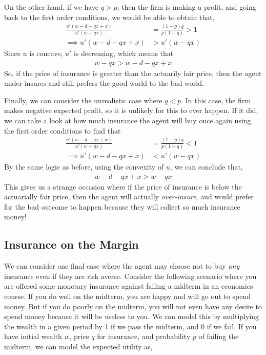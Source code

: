 On the other hand, if we have $q > p$, then the firm is making a profit, and going back to the first order conditions, we would be able to obtain that,
\begin{align*}
    \frac{u'(w - d - qx + x)}{u'(w - qx)} &= \frac{(1- p) q}{p (1 - q)} > 1 \\
    \implies u'(w - d - qx + x) &> u'(w - qx)
\end{align*} 
Since $u$ is concave, $u'$ is decreasing, which means that 
\begin{align*}
    w - qx > w - d - qx + x
\end{align*}
So, if the price of insurance is greater than the actuarily fair price, then the agent under-insures and still prefers the good world to the bad world. 

Finally, we can consider the unrealistic case where $q < p$. In this case, the firm makes negative expected profit, so it is unlikely for this to ever happen. If it did, we can take a look at how much insurance the agent will buy once again using the first order conditions to find that
\begin{align*}
    \frac{u'(w - d - qx + x)}{u'(w - qx)} &= \frac{(1- p) q}{p (1 - q)} < 1 \\
    \implies u'(w - d - qx + x) &< u'(w - qx)
\end{align*}
By the same logic as before, using the convexity of $u$, we can conclude that,
\begin{align*}
    w - d - qx + x > w - qx
\end{align*}
This gives us a strange occasion where if the price of insurance is below the actuarially fair price, then the agent will actually \emph{over-insure}, and would prefer for the bad outcome to happen because they will collect so much insurance money! 

\subsection*{Insurance on the Margin}
We can consider one final case where the agent may choose not to buy \emph{any} insurance even if they are risk averse. Consider the following scenario where you are offered some monetary insurance against failing a midterm in an economics course. If you do well on the midterm, you are happy and will go out to spend money. But if you do poorly on the midterm, you will not even have any desire to spend money because it will be useless to you. We can model this by multiplying the wealth in a given period by 1 if we pass the midterm, and 0 if we fail. If you have initial wealth $w$, price $q$ for insurance, and probability $p$ of failing the midterm, we can model the expected utility as,

